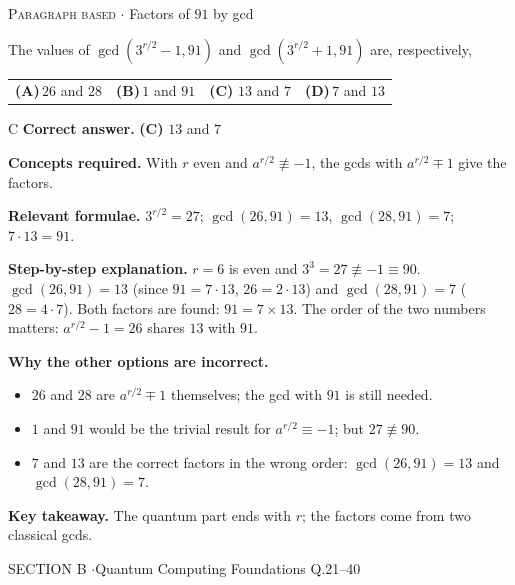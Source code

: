 \documentclass[11pt,a4paper]{article}
\newcommand{\optlabel}[1]{\textbf{(#1)}}
\newcommand{\correctlabel}[1]{\textcolor{okgreen}{\textbf{(#1)}\,\ding{51}}}
\newenvironment{qitem}[1]{\begin{list}{}{\setlength{\leftmargin}{3.3em}\setlength{\labelwidth}{3.1em}%
  \setlength{\labelsep}{0.2em}\setlength{\topsep}{3pt}\setlength{\parsep}{3pt}}\item[\textbf{Q.#1}\hfill]}{\end{list}}
\newcommand{\qsep}{\par\vspace{2pt}{\color{black!15}\hrule}\vspace{4pt}}
\newcommand{\qmeta}[2]{{\footnotesize\color{black!60}\textsc{#1} \;$\cdot$\; #2}\par}
\begin{document}
\begin{qitem}{20}
\qmeta{Paragraph based}{Factors of $91$ by gcd}
The values of $\gcd(3^{r/2} - 1, 91)$ and $\gcd(3^{r/2} + 1, 91)$ are, respectively,
\par\smallskip\noindent\begin{tabularx}{\linewidth}{@{}*{4}{L}@{}}
\optlabel{A}\,$26$ and $28$ & \optlabel{B}\,$1$ and $91$ & \correctlabel{C}\,$13$ and $7$ & \optlabel{D}\,$7$ and $13$
\end{tabularx}
\end{qitem}
\begin{solbox}{C}
\textbf{\color{brand}Correct answer.} \textcolor{okgreen}{\textbf{(C)}} $13$ and $7$

\textbf{\color{brand}Concepts required.} With $r$ even and $a^{r/2} \not\equiv -1$, the gcds with $a^{r/2} \mp 1$ give the factors.

\textbf{\color{brand}Relevant formulae.} $3^{r/2} = 27$; $\gcd(26, 91) = 13$, $\gcd(28, 91) = 7$; $7\cdot13 = 91$.

\textbf{\color{brand}Step-by-step explanation.} $r = 6$ is even and $3^3 = 27 \not\equiv -1 \equiv 90$. $\gcd(26, 91) = 13$ (since $91 = 7\cdot13$, $26 = 2\cdot13$) and $\gcd(28, 91) = 7$
($28 = 4\cdot7$). Both factors are found: $91 = 7\times13$. The order of the two numbers matters: $a^{r/2} - 1 = 26$ shares $13$ with $91$.

\textbf{\color{brand}Why the other options are incorrect.}
\begin{itemize}[leftmargin=2.4em, itemsep=1pt, topsep=2pt]
\item[\textbf{(A)}] $26$ and $28$ are $a^{r/2} \mp 1$ themselves; the gcd with $91$ is still needed.
\item[\textbf{(B)}] $1$ and $91$ would be the trivial result for $a^{r/2} \equiv -1$; but $27 \not\equiv 90$.
\item[\textbf{(D)}] $7$ and $13$ are the correct factors in the wrong order: $\gcd(26, 91) = 13$ and $\gcd(28, 91) = 7$.
\end{itemize}
\textbf{\color{brand}Key takeaway.} The quantum part ends with $r$; the factors come from two classical gcds.
\end{solbox}
\qsep

\newpage

\begin{sectionbanner}SECTION B \enspace$\cdot$\enspace Quantum Computing Foundations \hfill Q.21--40\end{sectionbanner}
\end{document}

